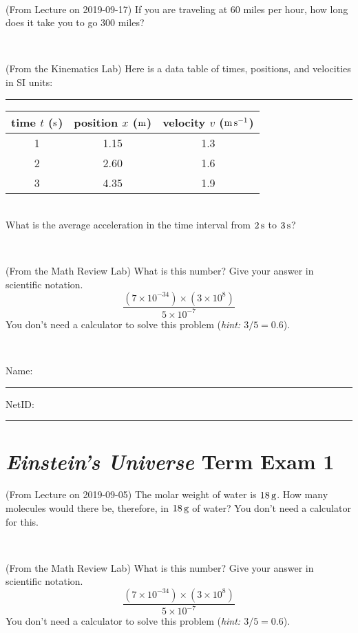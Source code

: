 \documentclass[12pt, letterpaper]{article}
\begin{document}
\vfill ~

\begin{problem} (From Lecture on 2019-09-17)
If you are traveling at 60 miles per hour, how long does
it take you to go 300 miles?
\end{problem}


\vfill ~

\begin{problem} (From the Kinematics Lab)
Here is a data table of times, positions, and velocities in SI units:\\
\rule{1.0in}{0pt}\begin{tabular}{c|c|c}
time $t$ ($\mathrm{s}$) & position $x$ ($\mathrm{m}$) & velocity $v$ ($\mathrm{m}\,\mathrm{s}^{-1}$) \\
\hline
1 & 1.15 & 1.3 \\
2 & 2.60 & 1.6 \\
3 & 4.35 & 1.9 \\
\hline
\end{tabular}\\
What is the average acceleration in the time interval from $2\,\mathrm{s}$ to $3\,\mathrm{s}$?
\end{problem}


\vfill ~

\begin{problem} (From the Math Review Lab)
What is this number? Give your answer in scientific notation.
$$
\frac{(7\times10^{-34})\times(3\times10^8)}{5\times10^{-7}}
$$
You don't need a calculator to solve this problem (\textit{hint: $3/5=0.6$}).
\end{problem}


\vfill ~


\cleardoublepage



\noindent
Name: \rule[-1ex]{0.60\textwidth}{0.1pt}
NetID: \rule[-1ex]{0.20\textwidth}{0.1pt}

\section*{\textsl{Einstein's Universe} Term Exam 1}
\setcounter{problem}{1}


\begin{problem} (From Lecture on 2019-09-05)
The molar weight of water is $18\,\mathrm{g}$. How many molecules would there
be, therefore, in $18\,\mathrm{g}$ of water? You don't need a calculator for
this.
\end{problem}


\vfill ~

\begin{problem} (From the Math Review Lab)
What is this number? Give your answer in scientific notation.
$$
\frac{(7\times10^{-34})\times(3\times10^8)}{5\times10^{-7}}
$$
You don't need a calculator to solve this problem (\textit{hint: $3/5=0.6$}).
\end{problem}
\end{document}
